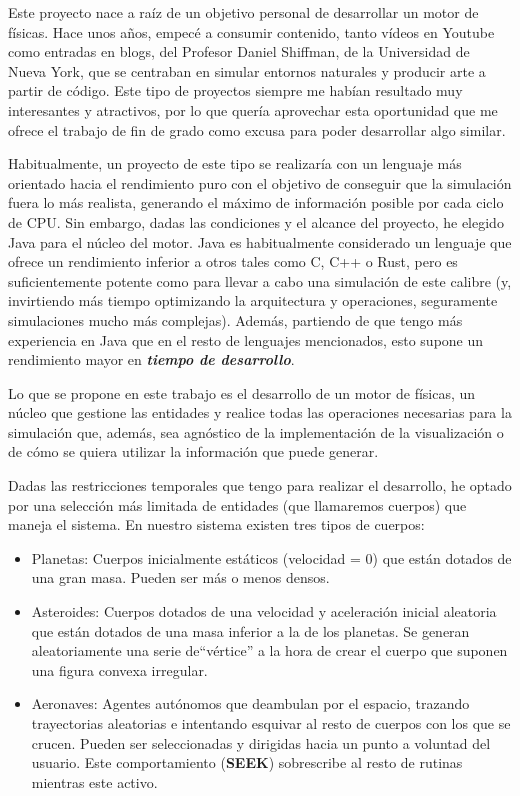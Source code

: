 
Este proyecto nace a raíz de un objetivo personal de desarrollar un motor de físicas. Hace unos años, empecé a consumir contenido, tanto vídeos en Youtube como entradas en blogs, del Profesor Daniel Shiffman, de la Universidad de Nueva York, que se centraban en simular entornos naturales y producir arte a partir de código. Este tipo de proyectos siempre me habían resultado muy interesantes y atractivos, por lo que quería aprovechar esta oportunidad que me ofrece el trabajo de fin de grado como excusa para poder desarrollar algo similar.

Habitualmente, un proyecto de este tipo se realizaría con un lenguaje más orientado hacia el rendimiento puro con el objetivo de conseguir que la simulación fuera lo más realista, generando el máximo de información posible por cada ciclo de CPU.
Sin embargo, dadas las condiciones y el alcance del proyecto, he elegido Java para el núcleo del motor.
Java es habitualmente considerado un lenguaje que ofrece un rendimiento inferior a otros tales como C, C++ o Rust, pero es suficientemente potente como para llevar a cabo una simulación de este calibre (y, invirtiendo más tiempo optimizando la arquitectura y operaciones, seguramente simulaciones mucho más complejas). Además, partiendo de que tengo más experiencia en Java que en el resto de lenguajes mencionados, esto supone un rendimiento mayor en \textbf{\textit{tiempo de desarrollo}}. 

Lo que se propone en este trabajo es el desarrollo de un motor de físicas, un núcleo que gestione las entidades y realice todas las operaciones necesarias para la simulación que, además, sea agnóstico de la implementación de la visualización o de cómo se quiera utilizar la información que puede generar.

Dadas las restricciones temporales que tengo para realizar el desarrollo, he optado por una selección más limitada de entidades (que llamaremos cuerpos) que maneja el sistema. En nuestro sistema existen tres tipos de cuerpos: 
\begin{itemize}
    \item Planetas: Cuerpos inicialmente estáticos (velocidad = 0) que están dotados de una gran masa. Pueden ser más o menos densos.

    \item Asteroides: Cuerpos dotados de una velocidad y aceleración inicial aleatoria que están dotados de una masa inferior a la de los planetas. Se generan aleatoriamente una serie de``vértice'' a la hora de crear el cuerpo que suponen una figura convexa irregular.

    \item Aeronaves: Agentes autónomos que deambulan por el espacio, trazando trayectorias aleatorias e intentando esquivar al resto de cuerpos con los que se crucen. Pueden ser seleccionadas y dirigidas hacia un punto a voluntad del usuario. Este comportamiento (\textbf{SEEK}) sobrescribe al resto de rutinas mientras este activo.
\end{itemize}




